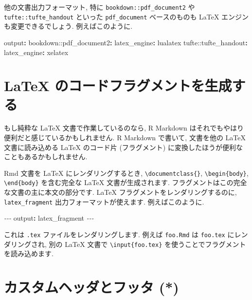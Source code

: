 \documentclass[
  11pt,
]{bxjsreport}
\newenvironment{Shaded}{\begin{snugshade}}{\end{snugshade}}
\newcommand{\AttributeTok}[1]{\textcolor[rgb]{0.77,0.63,0.00}{#1}}
\newcommand{\FunctionTok}[1]{\textcolor[rgb]{0.00,0.00,0.00}{#1}}
\newcommand{\KeywordTok}[1]{\textcolor[rgb]{0.13,0.29,0.53}{\textbf{#1}}}
\newcommand{\PreprocessorTok}[1]{\textcolor[rgb]{0.56,0.35,0.01}{\textit{#1}}}
\begin{document}
他の文書出力フォーマット, 特に \texttt{bookdown::pdf\_document2} や \texttt{tufte::tufte\_handout} といった \texttt{pdf\_document} ベースのものも LaTeX エンジンも変更できるでしょう. 例えばこのように.

\begin{Shaded}
\begin{Highlighting}[]
\FunctionTok{output}\KeywordTok{:}
\AttributeTok{  bookdown::pdf\_document2}\KeywordTok{:}\FunctionTok{}
\AttributeTok{    }\FunctionTok{latex\_engine}\KeywordTok{:}\AttributeTok{ lualatex}
\AttributeTok{  tufte::tufte\_handout}\KeywordTok{:}\FunctionTok{}
\AttributeTok{    }\FunctionTok{latex\_engine}\KeywordTok{:}\AttributeTok{ xelatex}
\end{Highlighting}
\end{Shaded}

\hypertarget{latex-fragment}{%
\section{LaTeX のコードフラグメントを生成する}\label{latex-fragment}}

もし純粋な LaTeX 文書で作業しているのなら, R Markdown はそれでもやはり便利だと感じているかもしれません. R Markdown で書いて, 文書を他の LaTeX 文書に読み込める LaTeX のコード片 (フラグメント) に変換したほうが便利なこともあるかもしれません.

Rmd 文書を LaTeX にレンダリングするとき, \texttt{\textbackslash{}documentclass\{\}}, \texttt{\textbackslash{}begin\{body\}}, \texttt{\textbackslash{}end\{body\}} を含む完全な LaTeX 文書が生成されます. フラグメントはこの完全な文書の主に本文の部分です. LaTeX フラグメントをレンダリングするのに, \texttt{latex\_fragment} 出力フォーマットが使えます. 例えばこのように.

\begin{Shaded}
\begin{Highlighting}[]
\PreprocessorTok{{-}{-}{-}}
\FunctionTok{output}\KeywordTok{:}\AttributeTok{ latex\_fragment}
\PreprocessorTok{{-}{-}{-}}
\end{Highlighting}
\end{Shaded}

これは \texttt{.tex} ファイルをレンダリングします. 例えば \texttt{foo.Rmd} は \texttt{foo.tex} にレンダリングされ, 別の LaTeX 文書で \texttt{\textbackslash{}input\{foo.tex\}} を使うことでフラグメントを読み込めます.

\hypertarget{latex-header}{%
\section{カスタムヘッダとフッタ (*)}\label{latex-header}}
\end{document}
